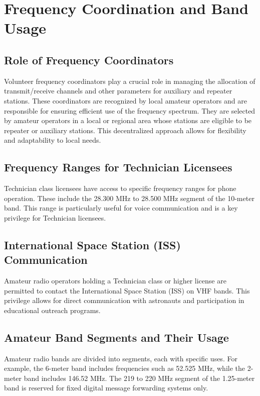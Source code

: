 \section{Frequency Coordination and Band Usage}
\label{sec:frequency_coordination}

\subsection*{Role of Frequency Coordinators}
Volunteer frequency coordinators play a crucial role in managing the allocation of transmit/receive channels and other parameters for auxiliary and repeater stations. These coordinators are recognized by local amateur operators and are responsible for ensuring efficient use of the frequency spectrum. They are selected by amateur operators in a local or regional area whose stations are eligible to be repeater or auxiliary stations. This decentralized approach allows for flexibility and adaptability to local needs.

\subsection*{Frequency Ranges for Technician Licensees}
Technician class licensees have access to specific frequency ranges for phone operation. These include the 28.300 MHz to 28.500 MHz segment of the 10-meter band. This range is particularly useful for voice communication and is a key privilege for Technician licensees.

\subsection*{International Space Station (ISS) Communication}
Amateur radio operators holding a Technician class or higher license are permitted to contact the International Space Station (ISS) on VHF bands. This privilege allows for direct communication with astronauts and participation in educational outreach programs.

\subsection*{Amateur Band Segments and Their Usage}
Amateur radio bands are divided into segments, each with specific uses. For example, the 6-meter band includes frequencies such as 52.525 MHz, while the 2-meter band includes 146.52 MHz. The 219 to 220 MHz segment of the 1.25-meter band is reserved for fixed digital message forwarding systems only.

